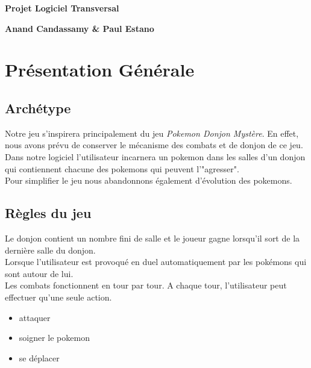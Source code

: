 \documentclass[a4paper,12pt]{article}
\begin{document}
    \thispagestyle{empty}

    \begin{titlepage}

        \vspace*{2cm}

        \begin{center}\textbf{\Huge Projet Logiciel Transversal}\end{center}{\Large \par}

        \begin{center}\textbf{\large Anand Candassamy \& Paul Estano}\end{center}{\large \par}

        \vspace{2cm}

        \clearpage

        {\small
        \tableofcontents
        }

    \end{titlepage}

    \clearpage
    \section{Présentation Générale}

    \subsection{Archétype}
	    Notre jeu s'inspirera principalement du jeu \emph{Pokemon Donjon Mystère}. En effet, nous avons prévu de conserver le mécanisme des combats et de donjon de ce jeu.
	    \\Dans notre logiciel l'utilisateur incarnera un pokemon dans les salles d'un donjon qui contiennent chacune des pokemons qui peuvent l'"agresser".
	    \\Pour simplifier le jeu nous abandonnons également d'évolution des pokemons.

    \subsection{Règles du jeu}
	  Le donjon contient un nombre fini de salle et le joueur gagne lorsqu'il sort de la dernière salle du donjon.
	   \\Lorsque l'utilisateur est provoqué en duel automatiquement par les pokémons qui sont autour de lui.
\\Les combats fonctionnent en tour par tour. A chaque tour, l'utilisateur peut effectuer qu’une seule action.
\begin{itemize}
    \item attaquer
    \item soigner le pokemon
    \item se déplacer
\end{itemize}
\clearpage
\end{document}
